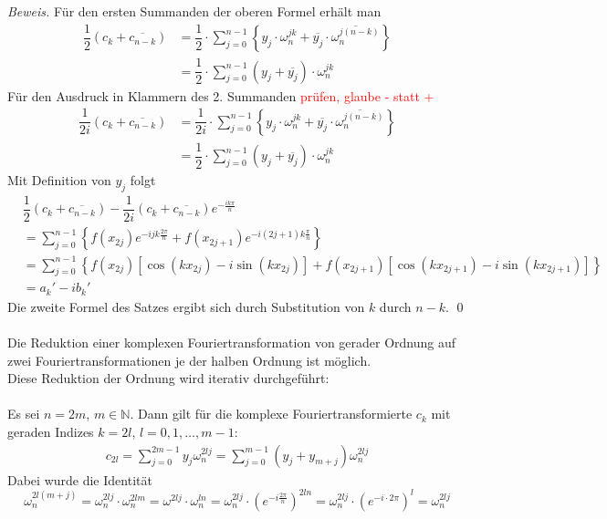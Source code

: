 \textit{Beweis.} 
Für den ersten Summanden der oberen Formel erhält man 
\begin{align*}
    \dfrac{1}{2}\left(c_k+\overline{c_{n-k}}\right) 
    &= \dfrac{1}{2}\cdot\sum_{j=0}^{n-1}\left\{y_j\cdot\omega_n^{jk} + \overline{y_j}\cdot\overline{\omega_n^{j(n-k)}}\right\} \\
    &= \dfrac{1}{2}\cdot\sum_{j=0}^{n-1}\left(y_j+\overline{y_j}\right)\cdot\omega_n^{jk}
\end{align*}
Für den Ausdruck in Klammern des 2. Summanden \textcolor{red}{prüfen, glaube - statt +}
\begin{align*}
    \dfrac{1}{2i}\left(c_k+\overline{c_{n-k}}\right) 
    &= \dfrac{1}{2i}\cdot\sum_{j=0}^{n-1}\left\{y_j\cdot\omega_n^{jk} + \overline{y_j}\cdot\overline{\omega_n^{j(n-k)}}\right\} \\
    &= \dfrac{1}{2}\cdot\sum_{j=0}^{n-1}\left(y_j+\overline{y_j}\right)\cdot\omega_n^{jk}
\end{align*}
Mit Definition von $y_j$ folgt
\begin{align*}
    &\dfrac{1}{2}\left(c_k+\overline{c_{n-k}}\right) - \dfrac{1}{2i}\left(c_k+\overline{c_{n-k}}\right)e^{-\tfrac{ik\pi}{n}}\\
    &= \sum_{j=0}^{n-1}\left\{f(x_{2j})e^{-ijk\tfrac{2\pi}{n}}+f(x_{2j+1})e^{-i(2j+1)k\tfrac{\pi}{n}}\right\} \\
    &= \sum_{j=0}^{n-1}\left\{f(x_{2j})\left[\cos(kx_{2j})-i\sin(kx_{2j})\right]
    + f(x_{2j+1})\left[\cos(kx_{2j+1})-i\sin(kx_{2j+1})\right]\right\} \\
    &= a_k' - ib_k'
\end{align*}
Die zweite Formel des Satzes ergibt sich durch Substitution von $k$ durch $n-k$. 
\qed\\ \\
Die Reduktion einer komplexen Fouriertransformation von gerader Ordnung auf zwei Fouriertransformationen je der halben
Ordnung ist möglich. \\
Diese Reduktion der Ordnung wird iterativ durchgeführt: \\ \\
Es sei $n=2m$, $m\in\mathbb{N}$. Dann gilt für die komplexe Fouriertransformierte $c_k$ mit geraden Indizes 
$k=2l$, $l=0,1,\dots,m-1$:
\begin{align*}
    c_{2l} = \sum_{j=0}^{2m-1}y_j\omega_n^{2lj} = \sum_{j=0}^{m-1} (y_j+y_{m+j})\omega_n^{2lj}
\end{align*}
Dabei wurde die Identität 
\[
    \omega_n^{2l(m+j)} 
    = \omega_n^{2lj}\cdot \omega_n^{2lm} 
    = \omega^{2lj}\cdot \omega_n^{ln} = \omega_n^{2lj}\cdot \left(e^{-i\tfrac{2\pi}{n}}\right)^{2ln} 
    = \omega_n^{2lj}\cdot \left(e^{-i\cdot2\pi}\right)^l 
    = \omega_n^{2lj}
\]
